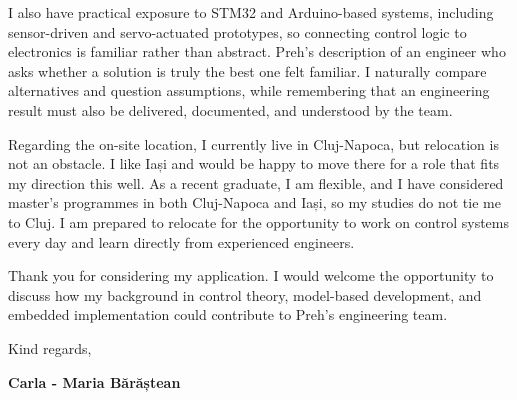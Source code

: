 \documentclass[11pt,a4paper]{article}
\begin{document}
I also have practical exposure to STM32 and Arduino-based systems, including sensor-driven and servo-actuated prototypes, so connecting control logic to electronics is familiar rather than abstract. Preh's description of an engineer who asks whether a solution is truly the best one felt familiar. I naturally compare alternatives and question assumptions, while remembering that an engineering result must also be delivered, documented, and understood by the team.

Regarding the on-site location, I currently live in Cluj-Napoca, but relocation is not an obstacle. I like Iași and would be happy to move there for a role that fits my direction this well. As a recent graduate, I am flexible, and I have considered master's programmes in both Cluj-Napoca and Iași, so my studies do not tie me to Cluj. I am prepared to relocate for the opportunity to work on control systems every day and learn directly from experienced engineers.

Thank you for considering my application. I would welcome the opportunity to discuss how my background in control theory, model-based development, and embedded implementation could contribute to Preh's engineering team.

\vspace{0.2cm}
Kind regards,\par
\textbf{Carla - Maria Bărăștean}
\end{document}
